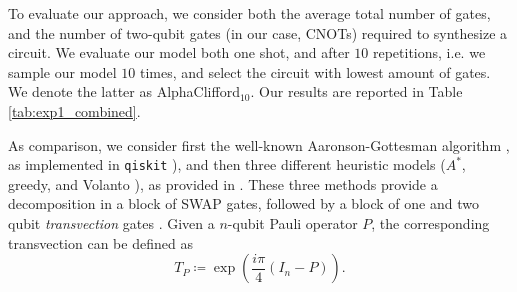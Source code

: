 \documentclass[conference]{IEEEtran}
\begin{document}
To evaluate our approach, we consider both the average total number of gates, and the number of two-qubit gates (in our case, CNOTs) required to synthesize a circuit. We evaluate our model both one shot, and after $10$ repetitions, i.e. we sample our model $10$ times, and select the circuit with lowest amount of gates. We denote the latter as AlphaClifford$_{10}$. Our results are reported in Table \ref{tab:exp1_combined}.

As comparison, we consider first the well-known Aaronson-Gottesman algorithm \cite{AG_for_clifford}, as implemented in \texttt{qiskit} \cite{qiskit}), and then three different heuristic models ($A^*$, greedy, and Volanto \cite{volanto}), as provided in \cite{webster}. These three methods provide a decomposition in a block of SWAP gates, followed by a block of one and two qubit \textit{transvection} gates \cite{transvection}. Given a $n$-qubit Pauli operator $P$, the corresponding transvection can be defined as \begin{equation}
      T_P\coloneqq \exp\left( \frac{i\pi}{4}(I_n-P)\right).
  \end{equation}
  
\end{document}
